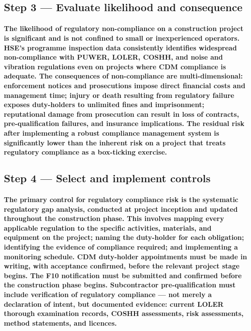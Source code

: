 \subsection{Step 3 --- Evaluate likelihood and consequence}
\paragraph{The likelihood of regulatory non-compliance on a construction project is significant and is not confined to small or inexperienced operators. HSE's programme inspection data consistently identifies widespread non-compliance with PUWER, LOLER, COSHH, and noise and vibration regulations even on projects where CDM compliance is adequate. The consequences of non-compliance are multi-dimensional: enforcement notices and prosecutions impose direct financial costs and management time; injury or death resulting from regulatory failure exposes duty-holders to unlimited fines and imprisonment; reputational damage from prosecution can result in loss of contracts, pre-qualification failures, and insurance implications. The residual risk after implementing a robust compliance management system is significantly lower than the inherent risk on a project that treats regulatory compliance as a box-ticking exercise.}

\subsection{Step 4 --- Select and implement controls}
\paragraph{The primary control for regulatory compliance risk is the systematic regulatory gap analysis, conducted at project inception and updated throughout the construction phase. This involves mapping every applicable regulation to the specific activities, materials, and equipment on the project; naming the duty-holder for each obligation; identifying the evidence of compliance required; and implementing a monitoring schedule. CDM duty-holder appointments must be made in writing, with acceptance confirmed, before the relevant project stage begins. The F10 notification must be submitted and confirmed before the construction phase begins. Subcontractor pre-qualification must include verification of regulatory compliance --- not merely a declaration of intent, but documented evidence: current LOLER thorough examination records, COSHH assessments, risk assessments, method statements, and licences.}


